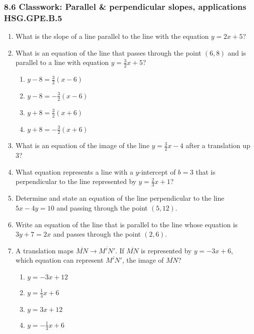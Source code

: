 \documentclass[12pt, twoside]{article}
\begin{document}
\subsubsection*{8.6 Classwork: Parallel \& perpendicular slopes, applications \hfill HSG.GPE.B.5}
\begin{enumerate}[itemsep=2cm]
\item What is the slope of a line parallel to the line with the equation $y=2x+5$?

\item What is an equation of the line that passes through the point $(6,8)$ and is parallel to a line with equation $y=\frac{3}{2}x+5$?
  \begin{multicols}{2}
    \begin{enumerate}
      \item $y-8=\frac{3}{2}(x-6)$
      \item $y-8=-\frac{3}{2}(x-6)$ 
      \item $y+8=\frac{3}{2}(x+6)$
      \item $y+8=-\frac{3}{2}(x+6)$
    \end{enumerate}
  \end{multicols}

\item What is an equation of the image of the line $\displaystyle y=\frac{3}{2}x-4$ after a translation up 3?

\item What equation represents a line with a $y$-intercept of $b=3$ that is perpendicular to the line represented by $\displaystyle y=\frac{2}{3}x+1$?
    
\item Determine and state an equation of the line perpendicular to the line\\ $5x-4y=10$ and passing through the point $(5,12)$. \vspace{1cm}

\item Write an equation of the line that is parallel to the line whose equation is $3y+7=2x$ and passes through the point $(2,6)$. \vspace{1cm}

\newpage
\item A translation maps $\overline{MN} \rightarrow \overline{M'N'}$. If $\overline{MN}$ is represented by $y=-3x+6$, which equation can represent $\overline{M'N'}$, the image of $\overline{MN}$?
  \begin{multicols}{2}
    \begin{enumerate}
      \item $y=-3x+12$
      \item $y=\frac{1}{3}x+6$ 
      \item $y=3x+12$
      \item $y=-\frac{1}{3}x+6$
    \end{enumerate}
  \end{multicols}


\end{enumerate}
\end{document}
